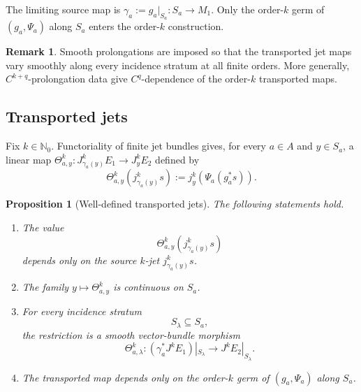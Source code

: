 \documentclass[11pt]{article}
\theoremstyle{plain}
\newtheorem{proposition}[theorem]{Proposition}
\theoremstyle{definition}
\newtheorem{remark}[theorem]{Remark}
\begin{document}
The limiting source map is
\(\gamma_a := g_a|_{S_a}: S_a\longrightarrow M_1\).
Only the order-\(k\) germ of \((g_a,\Psi_a)\) along \(S_a\) enters the
order-\(k\) construction.

\begin{remark}
Smooth prolongations are imposed so that the transported jet maps vary
smoothly along every incidence stratum at all finite orders. More
generally, \(C^{k+q}\)-prolongation data give \(C^q\)-dependence of the
order-\(k\) transported maps.
\end{remark}

\subsection{Transported jets}
\label{subsec:transported-jets}

Fix
\(k\in\mathbb N_0\).
Functoriality of finite jet bundles
\citep{Saunders1989JetBundles,KolarMichorSlovak1993}
gives, for every \(a\in A\) and \(y\in S_a\), a linear map \(\Theta_{a,y}^k: J_{\gamma_a(y)}^kE_1 \longrightarrow J_y^kE_2\) defined by
\[
  \Theta_{a,y}^k
  \left(
    j_{\gamma_a(y)}^k s
  \right)
  :=
  j_y^k
  \left(
    \Psi_a(g_a^*s)
  \right).
\]

\begin{proposition}[Well-defined transported jets]
\label{prop:transported-jet-well-defined}
The following statements hold.

\begin{enumerate}[label=\textup{(\roman*)}]
  \item The value
        \[
          \Theta_{a,y}^k
          \left(
            j_{\gamma_a(y)}^k s
          \right)
        \]
        depends only on the source \(k\)-jet
        \(j_{\gamma_a(y)}^k s\).

  \item The family \(y\mapsto\Theta_{a,y}^k\) is continuous on
        \(S_a\).

  \item For every incidence stratum
        \[
          S_\lambda\subseteq S_a,
        \]
        the restriction is a smooth vector-bundle morphism
        \[
          \Theta_{a,\lambda}^k:
          \left(\gamma_a^*J^kE_1\right)|_{S_\lambda}
          \longrightarrow
          J^kE_2|_{S_\lambda}.
        \]

  \item The transported map depends only on the order-\(k\) germ of
        \((g_a,\Psi_a)\) along \(S_a\).
\end{enumerate}
\end{proposition}
\end{document}

